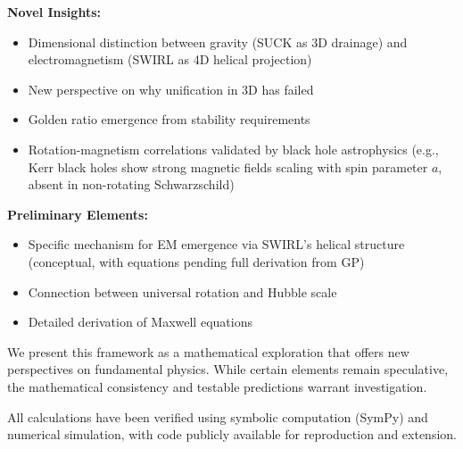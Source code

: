 \textbf{Novel Insights:}
\begin{itemize}
\item Dimensional distinction between gravity (SUCK as 3D drainage) and electromagnetism (SWIRL as 4D helical projection)
\item New perspective on why unification in 3D has failed
\item Golden ratio emergence from stability requirements
\item Rotation-magnetism correlations validated by black hole astrophysics (e.g., Kerr black holes show strong magnetic fields scaling with spin parameter $a$, absent in non-rotating Schwarzschild)
\end{itemize}

\textbf{Preliminary Elements:}
\begin{itemize}
\item Specific mechanism for EM emergence via SWIRL's helical structure (conceptual, with equations pending full derivation from GP)
\item Connection between universal rotation and Hubble scale
\item Detailed derivation of Maxwell equations
\end{itemize}

We present this framework as a mathematical exploration that offers new perspectives on fundamental physics. While certain elements remain speculative, the mathematical consistency and testable predictions warrant investigation.

All calculations have been verified using symbolic computation (SymPy) and numerical simulation, with code publicly available for reproduction and extension.
